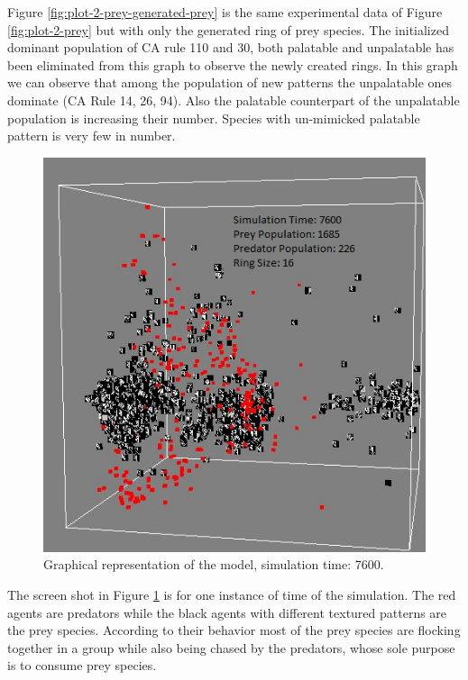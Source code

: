Figure \ref{fig:plot-2-prey-generated-prey} is the same experimental data of Figure \ref{fig:plot-2-prey} but with only the generated ring of prey species. The initialized dominant population of CA rule 110 and 30, both palatable and unpalatable has been eliminated from this graph to observe the newly created rings. In this graph we can observe that among the population of new patterns the unpalatable ones dominate (CA Rule 14, 26, 94). Also the palatable counterpart of the unpalatable population is increasing their number. Species with un-mimicked palatable pattern is very few in number.

\begin{figure}[H]
	\centering
	\label{fig:screenshot-simTime7600-2-prey}
	\includegraphics[scale=0.55]{images/simTime7600}
	\caption[Graphical representation of the model (simulation time: 7600)]{Graphical representation of the model, simulation time: 7600.}
\end{figure}

The screen shot in Figure \ref{fig:screenshot-simTime7600-2-prey} is for one instance of time of the simulation. The red agents are predators while the black agents with different textured patterns are the prey species. According to their behavior most of the prey species are flocking together in a group while also being chased by the predators, whose sole purpose is to consume prey species. 

